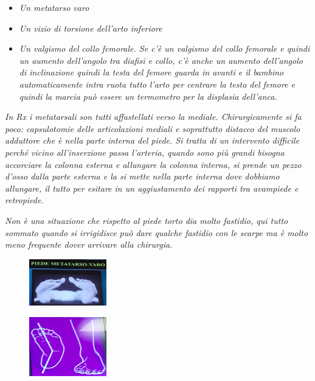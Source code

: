 \begin{itemize}
\item
  \emph{Un metatarso varo}
\item
  \emph{Un vizio di torsione dell'arto inferiore }
\item
  \emph{Un valgismo del collo femorale. Se c'è un valgismo del collo femorale e quindi un aumento dell'angolo tra diafisi e collo, c'è anche un aumento dell'angolo di inclinazione quindi la testa del femore guarda in avanti e il bambino automaticamente intra ruota tutto l'arto per centrare la testa del femore e quindi la marcia può essere un termometro per la displasia dell'anca. }
\end{itemize}

\emph{In Rx i metatarsali son tutti affastellati verso la mediale.
Chirurgicamente si fa poco: capsulotomie delle articolazioni mediali e soprattutto distacco del muscolo adduttore che è nella parte interna del piede. Si tratta di un intervento difficile perché vicino all'inserzione
passa l'arteria, quando sono più grandi bisogna accorciare la colonna esterna e allungare la colonna interna, si prende un pezzo d'osso dalla parte esterna e la si mette nella parte interna dove dobbiamo allungare, il tutto per esitare in un aggiustamento dei rapporti tra avampiede e
retropiede.}

\emph{Non è una situazione che rispetto al piede torto dia molto fastidio, qui tutto sommato quando si irrigidisce può dare qualche fastidio con le scarpe ma è molto meno frequente dover arrivare alla chirurgia.}

\begin{figure}[!ht]
\centering
\includegraphics[width=0.3\textwidth]{016/image48.png}
\end{figure}

\begin{figure}[!ht]
\centering
\includegraphics[width=0.3\textwidth]{016/image49.png}
\end{figure}

